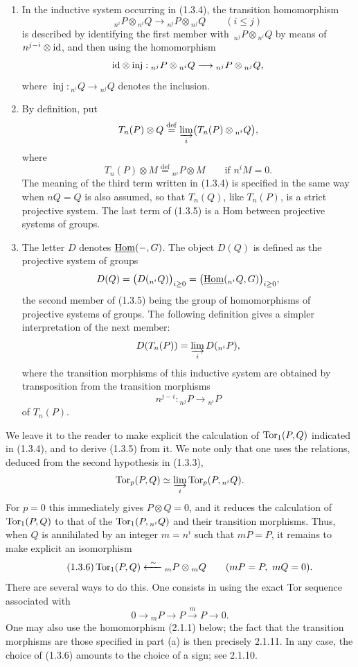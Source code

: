 \begin{enumerate}[label=\alph*)]
\item In the inductive system occurring in (1.3.4), the transition
homomorphism
\[
 {}_{n^i}P\otimes{}_{n^i}Q
 \longrightarrow
 {}_{n^j}P\otimes{}_{n^j}Q
 \qquad(i\leq j)
\]
is described by identifying the first member with
$\,{}_{n^j}P\otimes{}_{n^i}Q$ by means of
$n^{j-i}\otimes\mathrm{id}$, and then using the homomorphism
\[
 \mathrm{id}\otimes\operatorname{inj}:
 {}_{n^j}P\otimes{}_{n^i}Q
 \longrightarrow
 {}_{n^j}P\otimes{}_{n^j}Q,
\]
where
$\operatorname{inj}:{}_{n^i}Q\longrightarrow{}_{n^j}Q$
denotes the inclusion.

\item By definition, put
\[
 T_n(P)\otimes Q
 \overset{\mathrm{def}}{=}
 \varinjlim_i\bigl(T_n(P)\otimes{}_{n^i}Q\bigr),
\]
where
\[
 T_n(P)\otimes M
 \overset{\mathrm{def}}{=}
 {}_{n^i}P\otimes M
 \qquad\text{if }n^iM=0.
\]
The meaning of the third term written in (1.3.4) is specified in the
same way when $nQ=Q$ is also assumed, so that $T_n(Q)$, like
$T_n(P)$, is a strict projective system.  The last term of (1.3.5) is
a Hom between projective systems of groups.

\item The letter $D$ denotes $\uHom(-,G)$.  The object $D(Q)$ is
defined as the projective system of groups
\[
 D(Q)=\bigl(D({}_{n^i}Q)\bigr)_{i\geq0}
 =\bigl(\uHom({}_{n^i}Q,G)\bigr)_{i\geq0},
\]
the second member of (1.3.5) being the group of homomorphisms of
projective systems of groups.  The following definition gives a
simpler interpretation of the next member:
\[
 D(T_n(P))=\varinjlim_iD({}_{n^i}P),
\]
where the transition morphisms of this inductive system are obtained
by transposition from the transition morphisms
\[
 n^{j-i}:{}_{n^j}P\longrightarrow{}_{n^i}P
\]
of $T_n(P)$.
\end{enumerate}

We leave it to the reader to make explicit the calculation of
$\operatorname{Tor}_1(P,Q)$ indicated in (1.3.4), and to derive (1.3.5) from it.
We note only that one uses the relations, deduced from the second
hypothesis in (1.3.3),
\[
 \operatorname{Tor}_p(P,Q)\simeq
 \varinjlim_i\operatorname{Tor}_p(P,{}_{n^i}Q).
\]
For $p=0$ this immediately gives $P\otimes Q=0$, and it reduces the
calculation of $\operatorname{Tor}_1(P,Q)$ to that of the
$\operatorname{Tor}_1(P,{}_{n^i}Q)$ and their transition morphisms.  Thus, when
$Q$ is annihilated by an integer $m=n^i$ such that $mP=P$, it remains
to make explicit an isomorphism
\begin{equation}\tag{1.3.6}
 \operatorname{Tor}_1(P,Q)
 \xleftarrow{\ \sim\ }
 {}_mP\otimes{}_mQ
 \qquad(mP=P,\ mQ=0).
\end{equation}
There are several ways to do this.  One consists in using the exact
Tor sequence associated with
\[
 0\longrightarrow{}_mP\longrightarrow P
 \xrightarrow{\ m\ }P\longrightarrow0.
\]
One may also use the homomorphism (2.1.1) below; the fact that the
transition morphisms are those specified in part (a) is then precisely
2.1.11.  In any case, the choice of (1.3.6) amounts to the choice of a
sign; see 2.1.10.

